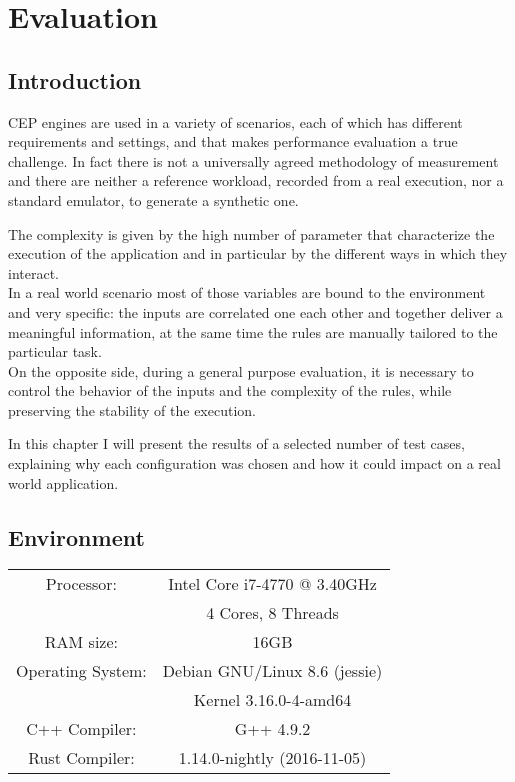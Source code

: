 \chapter{Evaluation}

\section{Introduction}
CEP engines are used in a variety of scenarios, each of which has different requirements and settings, and that makes performance evaluation a true challenge. In fact there is not a universally agreed methodology of measurement and there are neither a reference workload, recorded from a real execution, nor a standard emulator, to generate a synthetic one.

The complexity is given by the high number of parameter that characterize the execution of the application and in particular by the different ways in which they interact.\\
In a real world scenario most of those variables are bound to the environment and very specific: the inputs are correlated one each other and together deliver a meaningful information, at the same time the rules are manually tailored to the particular task.\\
On the opposite side, during a general purpose evaluation, it is necessary to control the behavior of the inputs and the complexity of the rules, while preserving the stability of the execution.

In this chapter I will present the results of a selected number of test cases, explaining why each configuration was chosen and how it could impact on a real world application.

\section{Environment}
\begin{table}[h]
  \begin{center}
    \begin{tabular}{|c|c|}
      \hline
      Processor: 		& Intel Core i7-4770 @ 3.40GHz\\
                        & 4 Cores, 8 Threads\\ 
      \hline
      RAM size: 		& 16GB\\
      \hline
      Operating System: & Debian GNU/Linux 8.6 (jessie)\\
                        & Kernel 3.16.0-4-amd64\\
      \hline
      C++ Compiler:     & G++ 4.9.2\\
      \hline
      Rust Compiler:    & 1.14.0-nightly (2016-11-05)\\
      \hline
    \end{tabular}
  \end{center}
\end{table}

